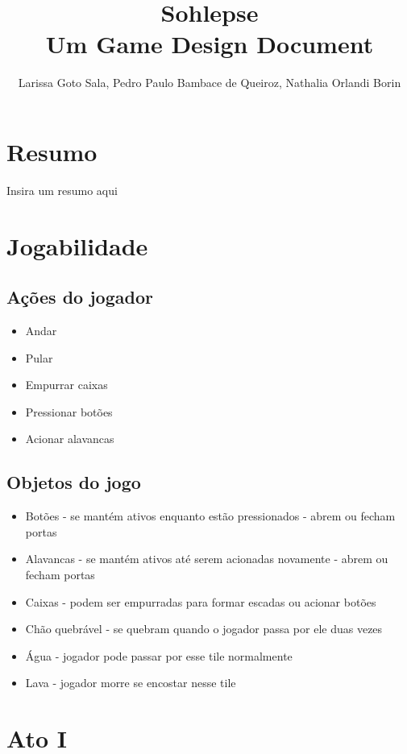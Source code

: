 \documentclass[a4paper, 11pt]{article}
\title{\textbf{Sohlepse} \\ \small{Um Game Design Document}}
\author{Larissa Goto Sala, Pedro Paulo Bambace de Queiroz, Nathalia Orlandi Borin}
\begin{document}
\maketitle

\newpage

\newpage

\section{Resumo}
	
	Insira um resumo aqui

\section{Jogabilidade}

	\subsection{Ações do jogador}
		\begin{itemize}
			\item Andar 
			\item Pular 
			\item Empurrar caixas 
			\item Pressionar botões
			\item Acionar alavancas 
		\end{itemize}

	\subsection{Objetos do jogo}
		\begin{itemize}
			\item Botões - se mantém ativos enquanto estão pressionados - abrem ou fecham portas
			\item Alavancas - se mantém ativos até serem acionadas novamente - abrem ou fecham portas
			\item Caixas - podem ser empurradas para formar escadas ou acionar botões
			\item Chão quebrável - se quebram quando o jogador passa por ele duas vezes
			\item Água - jogador pode passar por esse tile normalmente
			\item Lava - jogador morre se encostar nesse tile
		\end{itemize}


\section{Ato I}
\end{document}
